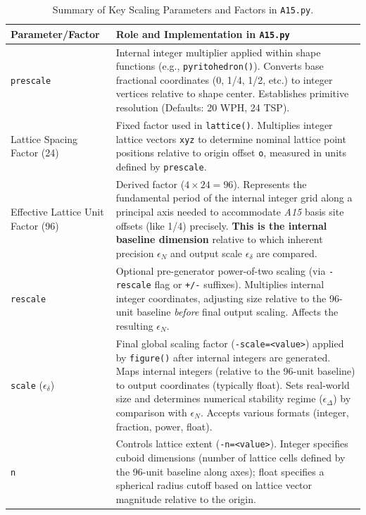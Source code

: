 \documentclass[10pt]{article}
\def\AAAB{\textit{A15}}
\begin{document}
\begin{table}[!ht]
\centering
\caption{Summary of Key Scaling Parameters and Factors in \texttt{A15.py}.}
\label{tab:scaling-params}
\begin{tabularx}{\textwidth}{>{\raggedright\arraybackslash}p{} >{\raggedright\arraybackslash}X}
\toprule
\textbf{Parameter/Factor} & \textbf{Role and Implementation in \texttt{A15.py}} \\
\midrule
\texttt{prescale} & Internal integer multiplier applied within shape functions (e.g., \texttt{pyritohedron()}). Converts base fractional coordinates (0, 1/4, 1/2, etc.) to integer vertices relative to shape center. Establishes primitive resolution (Defaults: \num{20} WPH, \num{24} TSP). \\ \addlinespace
Lattice Spacing Factor (\num{24}) & Fixed factor used in \texttt{lattice()}. Multiplies integer lattice vectors \texttt{xyz} to determine nominal lattice point positions relative to origin offset \texttt{o}, measured in units defined by \texttt{prescale}. \\ \addlinespace
Effective Lattice Unit Factor (\num{96}) & Derived factor ($4 \times 24 = 96$). Represents the fundamental period of the internal integer grid along a principal axis needed to accommodate \AAAB{} basis site offsets (like 1/4) precisely. \textbf{This is the internal baseline dimension} relative to which inherent precision $\epsilon_N$ and output scale $\epsilon_\delta$ are compared. \\ \addlinespace
\texttt{rescale} & Optional pre-generator power-of-two scaling (via \texttt{-rescale} flag or \texttt{+/-} suffixes). Multiplies internal integer coordinates, adjusting size relative to the 96-unit baseline \textit{before} final output scaling. Affects the resulting $\epsilon_N$. \\ \addlinespace
\texttt{scale} ($\epsilon_\delta$) & Final global scaling factor (\texttt{-scale=<value>}) applied by \texttt{figure()} after internal integers are generated. Maps internal integers (relative to the 96-unit baseline) to output coordinates (typically float). Sets real-world size and determines numerical stability regime ($\epsilon_\Delta$) by comparison with $\epsilon_N$. Accepts various formats (integer, fraction, power, float). \\ \addlinespace
\texttt{n} & Controls lattice extent (\texttt{-n=<value>}). Integer specifies cuboid dimensions (number of lattice cells defined by the 96-unit baseline along axes); float specifies a spherical radius cutoff based on lattice vector magnitude relative to the origin. \\
\bottomrule
\end{tabularx}
\end{table}
\end{document}
